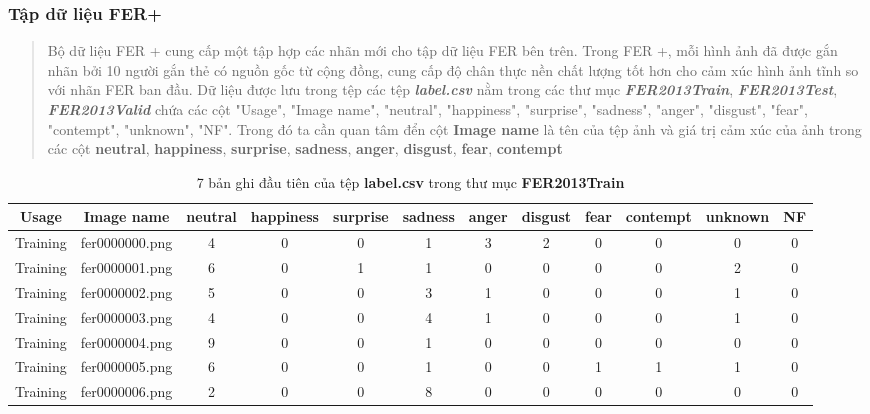 \documentclass{article}
\begin{document}
\subsubsection{Tập dữ liệu FER+}
\begin{quote}
   Bộ dữ liệu FER + cung cấp một tập hợp các nhãn mới cho tập dữ liệu FER bên trên.
   Trong FER +, mỗi hình ảnh đã được gắn nhãn bởi 10 người gắn thẻ có nguồn gốc từ cộng đồng,
   cung cấp độ chân thực nền chất lượng tốt hơn cho cảm xúc hình ảnh tĩnh so với nhãn FER ban đầu.
   Dữ liệu được lưu trong tệp các tệp \textbf{\textit{label.csv}} nằm trong các thư mục \textbf{\textit{FER2013Train}}, \textbf{\textit{FER2013Test}}, \textbf{\textit{FER2013Valid}} chứa các cột
   "Usage", "Image name", "neutral", "happiness", "surprise", "sadness", "anger", "disgust", "fear", "contempt", "unknown", "NF".
   Trong đó ta cần quan tâm đển cột \textbf{Image name} là tên của tệp ảnh và giá trị cảm xúc của ảnh trong các cột 
   \textbf{neutral},
   \textbf{happiness},
   \textbf{surprise},
   \textbf{sadness},
   \textbf{anger},
   \textbf{disgust},
   \textbf{fear},
   \textbf{contempt}
\end{quote}
\begin{table}[H]
   \centering
   \begin{tabular}{|c|c|c|c|c|c|c|c|c|c|c|c|}
      \hline
      Usage    & Image name     & neutral & happiness & surprise & sadness & anger & disgust & fear & contempt & unknown & NF \\ \hline
      Training & fer0000000.png & 4       & 0         & 0        & 1       & 3     & 2       & 0    & 0        & 0       & 0  \\ \hline
      Training & fer0000001.png & 6       & 0         & 1        & 1       & 0     & 0       & 0    & 0        & 2       & 0  \\ \hline
      Training & fer0000002.png & 5       & 0         & 0        & 3       & 1     & 0       & 0    & 0        & 1       & 0  \\ \hline
      Training & fer0000003.png & 4       & 0         & 0        & 4       & 1     & 0       & 0    & 0        & 1       & 0  \\ \hline
      Training & fer0000004.png & 9       & 0         & 0        & 1       & 0     & 0       & 0    & 0        & 0       & 0  \\ \hline
      Training & fer0000005.png & 6       & 0         & 0        & 1       & 0     & 0       & 1    & 1        & 1       & 0  \\ \hline
      Training & fer0000006.png & 2       & 0         & 0        & 8       & 0     & 0       & 0    & 0        & 0       & 0  \\ \hline
   \end{tabular}
   \caption{7 bản ghi đầu tiên của tệp \textbf{label.csv} trong thư mục \textbf{FER2013Train}}
   \label{table:7example}   
\end{table}
\end{document}
